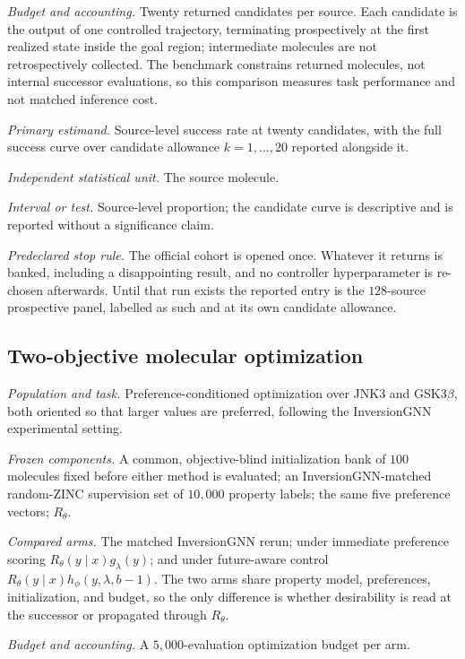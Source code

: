 \emph{Budget and accounting.} Twenty returned candidates per source. Each candidate is the output of one controlled trajectory, terminating prospectively at the first realized state inside the goal region; intermediate molecules are not retrospectively collected. The benchmark constrains returned molecules, not internal successor evaluations, so this comparison measures task performance and not matched inference cost.

\emph{Primary estimand.} Source-level success rate at twenty candidates, with the full success curve over candidate allowance $k=1,\dots,20$ reported alongside it.

\emph{Independent statistical unit.} The source molecule.

\emph{Interval or test.} Source-level proportion; the candidate curve is descriptive and is reported without a significance claim.

\emph{Predeclared stop rule.} The official cohort is opened once. Whatever it returns is banked, including a disappointing result, and no controller hyperparameter is re-chosen afterwards. Until that run exists the reported entry is the $128$-source prospective panel, labelled as such and at its own candidate allowance.

\subsection{Two-objective molecular optimization}
\label{app:proto-pareto}

\emph{Population and task.} Preference-conditioned optimization over JNK3 and GSK3$\beta$, both oriented so that larger values are preferred, following the InversionGNN experimental setting.

\emph{Frozen components.} A common, objective-blind initialization bank of $100$ molecules fixed before either method is evaluated; an InversionGNN-matched random-ZINC supervision set of $10{,}000$ property labels; the same five preference vectors; $R_\theta$.

\emph{Compared arms.} The matched InversionGNN rerun; \method{} under immediate preference scoring $R_\theta(y\mid x)g_\lambda(y)$; and \method{} under future-aware control $R_\theta(y\mid x)h_\phi(y,\lambda,b-1)$. The two \method{} arms share property model, preferences, initialization, and budget, so the only difference is whether desirability is read at the successor or propagated through $R_\theta$.

\emph{Budget and accounting.} A $5{,}000$-evaluation optimization budget per arm.

